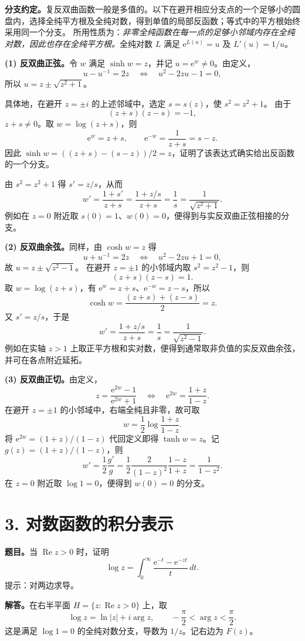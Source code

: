\documentclass[11pt,a4paper]{ctexart}
\newcommand{\e}{\mathrm e}
\begin{document}
\textbf{分支约定。}复反双曲函数一般是多值的。以下在避开相应分支点的一个足够小的圆盘内，选择全纯平方根及全纯对数，得到单值的局部反函数；等式中的平方根始终采用同一个分支。
所用性质为：\emph{非零全纯函数在每一点的足够小邻域内存在全纯对数，因此也存在全纯平方根。}全纯对数 $L$ 满足 $\e^{L(u)}=u$ 及 $L'(u)=1/u$。

\textbf{(1) 反双曲正弦。}令 $w$ 满足 $\sinh w=z$，并记 $u=\e^w\ne0$。由定义，
\[
u-u^{-1}=2z\quad\Longleftrightarrow\quad u^2-2zu-1=0,
\]
所以 $u=z\pm\sqrt{z^2+1}$。

具体地，在避开 $z=\pm i$ 的上述邻域中，选定 $s=s(z)$，使 $s^2=z^2+1$。
由于
\[
(z+s)(z-s)=-1,
\]
$z+s\ne0$。取 $w=\log(z+s)$，则
\[
\e^w=z+s,\qquad \e^{-w}=\frac1{z+s}=s-z.
\]
因此 $\sinh w=((z+s)-(s-z))/2=z$，证明了该表达式确实给出反函数的一个分支。

由 $s^2=z^2+1$ 得 $s'=z/s$，从而
\[
\boxed{w'=\frac{1+s'}{z+s}
=\frac{1+z/s}{z+s}=\frac1s=\frac1{\sqrt{z^2+1}}.}
\]
例如在 $z=0$ 附近取 $s(0)=1$、$w(0)=0$，便得到与实反双曲正弦相接的分支。

\textbf{(2) 反双曲余弦。}同样，由 $\cosh w=z$ 得
\[
u+u^{-1}=2z\quad\Longleftrightarrow\quad u^2-2zu+1=0,
\]
故 $u=z\pm\sqrt{z^2-1}$。
在避开 $z=\pm1$ 的小邻域内取 $s^2=z^2-1$，则
\[
(z+s)(z-s)=1.
\]
取 $w=\log(z+s)$，有 $\e^w=z+s$、$\e^{-w}=z-s$，所以
\[
\cosh w=\frac{(z+s)+(z-s)}2=z.
\]
又 $s'=z/s$，于是
\[
\boxed{w'=\frac{1+z/s}{z+s}=\frac1s=\frac1{\sqrt{z^2-1}}.}
\]
例如在实轴 $z>1$ 上取正平方根和实对数，便得到通常取非负值的实反双曲余弦，并可在各点附近延拓。

\textbf{(3) 反双曲正切。}由定义，
\[
z=\frac{\e^{2w}-1}{\e^{2w}+1}
\quad\Longleftrightarrow\quad
\e^{2w}=\frac{1+z}{1-z}.
\]
在避开 $z=\pm1$ 的小邻域中，右端全纯且非零，故可取
\[
w=\frac12\log\frac{1+z}{1-z}.
\]
将 $\e^{2w}=(1+z)/(1-z)$ 代回定义即得 $\tanh w=z$。记 $g(z)=(1+z)/(1-z)$，则
\[
\boxed{w'=\frac12\frac{g'}g
=\frac12\frac{2}{(1-z)^2}\frac{1-z}{1+z}
=\frac1{1-z^2}.}
\]
在 $z=0$ 附近取 $\log1=0$，便得到 $w(0)=0$ 的分支。

\newpage
\section*{3. 对数函数的积分表示}
\textbf{题目。}当 $\operatorname{Re}z>0$ 时，证明
\[
\log z=\int_0^\infty\frac{\e^{-t}-\e^{-zt}}t\,dt.
\]
提示：对两边求导。

\textbf{解答。}在右半平面 $H=\{z:\operatorname{Re}z>0\}$ 上，取
\[
\log z=\ln|z|+i\arg z,\qquad -\frac\pi2<\arg z<\frac\pi2.
\]
这是满足 $\log1=0$ 的全纯对数分支，导数为 $1/z$。记右边为 $F(z)$。
\end{document}

